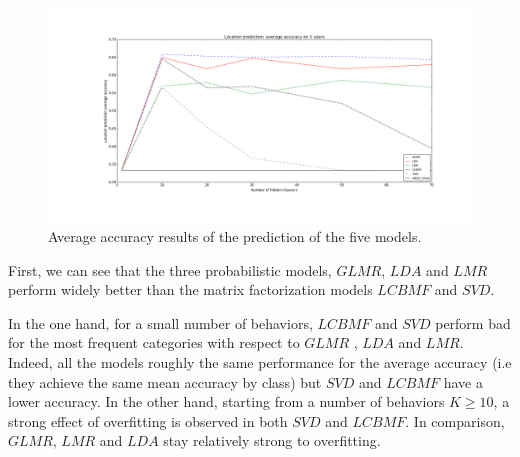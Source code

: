 \begin{figure} [!ht]
\caption{Average accuracy results of the prediction of the five models.}
\label{avacc}
\includegraphics[scale=0.3]{Figures/location_average_accuracy.png}
\end{figure}

First, we can see that the three probabilistic models, $GLMR$, $LDA$ and $LMR$ perform widely better than the matrix factorization models $LCBMF$ and $SVD$.

In the one hand, for a small number of behaviors, $LCBMF$ and $SVD$ perform bad for the most frequent categories with respect to $GLMR$ , $LDA$ and $LMR$. Indeed, all the models roughly the same performance for the average accuracy (i.e they achieve the same mean accuracy by class) but $SVD$ and $LCBMF$ have a lower accuracy. 
In the other hand, starting from a number of behaviors $K\geqslant 10$, a strong effect of overfitting is observed in both $SVD$ and $LCBMF$. In comparison, $GLMR$, $LMR$ and $LDA$ stay relatively strong to overfitting.

